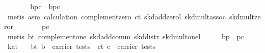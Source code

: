\begin{isabellebody}
\ \ \isamarkupfalse%
\ \isamarkupfalse%
\ {}{}{}{}\ {}\ {}b{}p{}c\ {}\ b{}p{}c{}\isanewline
\ \ \ \ \isamarkupfalse%
\ {}metis\ asm\ calculation\ complement{}zero\ ct\ skd{}add{}zerol\ skd{}mult{}assoc\ skd{}mult{}zeror{}\isanewline
\ \ \isamarkupfalse%
\ \isamarkupfalse%
\ {}{}{}{}\ {}\ p{}c{}\isanewline
\ \ \ \ \isamarkupfalse%
\ {}metis\ bt\ complement{}one\ skd{}add{}comm\ skd{}distr\ skd{}mult{}onel{}\isanewline
\ \ \isamarkupfalse%
\ \isamarkupfalse%
\ {}b{}p\ {}\ p{}c{}\ \isamarkupfalse%
\isanewline
{}\isamarkupfalse%
%
\endisatagproof
{\isafoldproof}%
%
\isadelimproof
\isanewline
%
\endisadelimproof
\isanewline
{}\isamarkupfalse%
\ kat{}{}\isanewline
\ \ \ bt{}\ {}b\ {}\ carrier\ tests{}\ \ ct{}\ {}c\ {}\ carrier\ tests{}\isanewline

\end{isabellebody}
